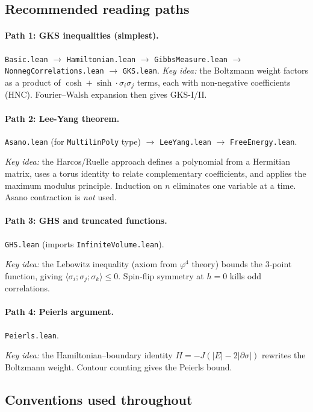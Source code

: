 \documentclass[a4paper,11pt]{article}
\begin{document}
\subsection{Recommended reading paths}

\paragraph{Path 1: GKS inequalities (simplest).}
\texttt{Basic.lean} $\to$ \texttt{Hamiltonian.lean} $\to$
\texttt{GibbsMeasure.lean} $\to$ \texttt{NonnegCorrelations.lean} $\to$
\texttt{GKS.lean}.
\emph{Key idea:} the Boltzmann weight factors as a product of
$\cosh + \sinh \cdot \sigma_i\sigma_j$ terms, each with non-negative
coefficients (HNC). Fourier--Walsh expansion then gives GKS-I/II.

\paragraph{Path 2: Lee-Yang theorem.}
\texttt{Asano.lean} (for \texttt{MultilinPoly} type) $\to$
\texttt{LeeYang.lean} $\to$ \texttt{FreeEnergy.lean}.

\emph{Key idea:} the Harcos/Ruelle approach defines a polynomial
from a Hermitian matrix, uses a torus identity to relate complementary
coefficients, and applies the maximum modulus principle.
Induction on $n$ eliminates one variable at a time.
Asano contraction is \emph{not} used.

\paragraph{Path 3: GHS and truncated functions.}
\texttt{GHS.lean} (imports \texttt{InfiniteVolume.lean}).

\emph{Key idea:} the Lebowitz inequality (axiom from $\varphi^4$ theory)
bounds the 3-point function, giving $\langle\sigma_i;\sigma_j;\sigma_k\rangle \le 0$.
Spin-flip symmetry at $h=0$ kills odd correlations.

\paragraph{Path 4: Peierls argument.}
\texttt{Peierls.lean}.

\emph{Key idea:} the Hamiltonian--boundary identity
$H = -J(|E| - 2|\partial\sigma|)$ rewrites the Boltzmann weight.
Contour counting gives the Peierls bound.

\subsection{Conventions used throughout}
\end{document}
